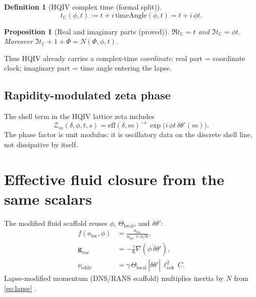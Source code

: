 \documentclass[11pt]{amsart}
\newtheorem{proposition}[theorem]{Proposition}
\newtheorem{definition}[theorem]{Definition}
\begin{document}
\begin{definition}[HQIV complex time (formal split)]
\label{def:complex-time}
\begin{equation}
  t_{\mathbb C}(\phi,t):=t+i\,\mathrm{timeAngle}(\phi,t)=t+i\,\phi t.
  \label{eq:hqiv-complex-time}
\end{equation}
\end{definition}

\begin{proposition}[Real and imaginary parts (proved)]
\label{prop:complex-parts}
$\Re t_{\mathbb C}=t$ and $\Im t_{\mathbb C}=\phi t$.
Moreover $\Im t_{\mathbb C}+1+\Phi=N(\Phi,\phi,t)$.
\end{proposition}

Thus HQIV already carries a complex-time \emph{coordinate}: real part = coordinate clock; imaginary
part = time angle entering the lapse.

\subsection{Rapidity-modulated zeta phase}

The shell term in the HQIV lattice zeta \cite{hqiv-oct-action-paper} includes
\begin{equation}
  \mathcal Z_m(\delta,\phi,t,s)
  =\mathrm{eff}(\delta,m)^{-s}\,
   \exp\!\bigl(i\,\phi t\,\delta\theta'(m)\bigr).
  \label{eq:zeta-term}
\end{equation}
The phase factor is unit modulus: it is oscillatory data on the discrete shell line, not dissipative
by itself.

\section{Effective fluid closure from the same scalars}
\label{sec:fluid}

The modified fluid scaffold \cite{hqiv-oct-action-paper} reuses $\phi$, $\Theta_{\mathrm{local}}$,
and $\dot\delta\theta'$:
\begin{align}
  f(a_{\mathrm{loc}},\phi) &= \frac{a_{\mathrm{loc}}}{a_{\mathrm{loc}}+\phi/6},
  \label{eq:inertia}\\
  \mathbf g_{\mathrm{vac}} &= -\frac{\gamma}{6}\nabla(\phi\,\dot\delta\theta'),
  \label{eq:vacuum}\\
  \nu_{\mathrm{eddy}} &= \gamma\,\Theta_{\mathrm{local}}\,|\dot\delta\theta'|\,\ell_{\mathrm{coh}}^2\,C.
  \label{eq:eddy}
\end{align}
Lapse-modified momentum (DNS/RANS scaffold) multiplies inertia by $N$ from
\eqref{eq:lapse} \cite{hqiv-oct-action-paper}.
\end{document}
